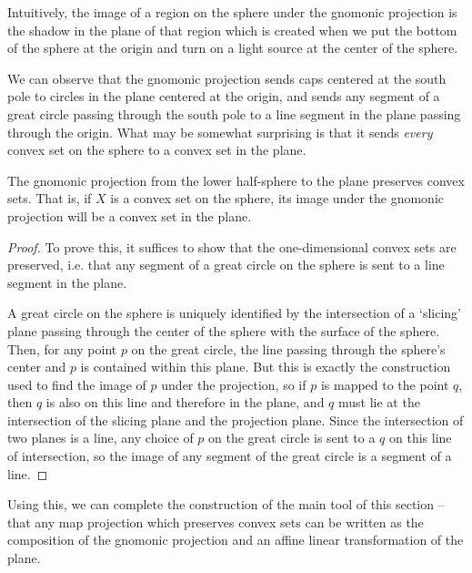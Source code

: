 	
	Intuitively, the image of a region on the sphere under the gnomonic projection is the shadow in the plane of that region which is created when we put the bottom of the sphere at the origin and turn on a light source at the center of the sphere.


We can observe that the gnomonic projection sends caps centered at the south pole to circles in the plane centered at the origin, and sends any segment of a great circle passing through the south pole to a line segment in the plane passing through the origin.  What may be somewhat surprising is that it sends \textit{every} convex set on the sphere to a convex set in the plane.


\begin{lemma}
The gnomonic projection from the lower half-sphere to the plane preserves convex sets.  That is, if $X$ is a convex set on the sphere, its image under the gnomonic projection will be a convex set in the plane.
\end{lemma}
\begin{proof}

To prove this, it suffices to show that the one-dimensional convex sets are preserved, i.e. that any segment of a great circle on the sphere is sent to a line segment in the plane.

A great circle on the sphere is uniquely identified by the intersection of a `slicing' plane passing through the center of the sphere with the surface of the sphere.  Then, for any point $p$ on the great circle, the line passing through the sphere's center and $p$ is contained within this plane.  But this is exactly the construction used to find the image of $p$ under the projection, so if $p$ is mapped to the point $q$, then $q$ is also on this line and therefore in the plane, and $q$ must lie at the intersection of the slicing plane and the projection plane.  Since the intersection of two planes is a line, any choice of $p$ on the great circle is sent to a $q$ on this line of intersection, so the image of any segment of the great circle is a segment of a line.
\end{proof}

Using this, we can complete the construction of the main tool of this section -- that any map projection which preserves convex sets can be written as the composition of the gnomonic projection and an affine linear transformation of the plane.


